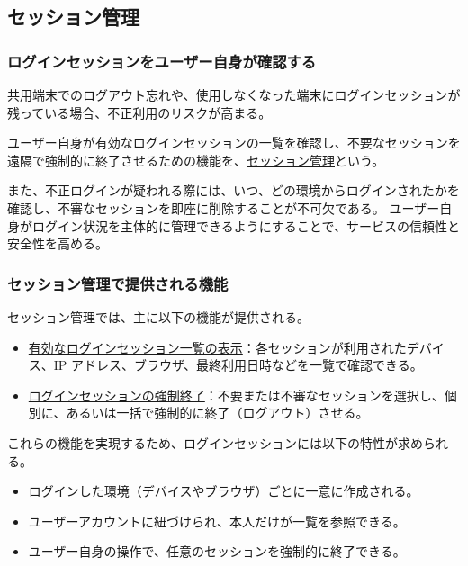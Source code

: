 \documentclass[uplatex]{jsarticle}
\def\label#1{}%
\begin{document}
\subsection{セッション管理}

\subsubsection{ログインセッションをユーザー自身が確認する}

共用端末でのログアウト忘れや、使用しなくなった端末にログインセッションが残っている場合、不正利用のリスクが高まる。

\begin{dfn}[セッション管理機能]\label{dfn:ch3-session-management-function}
ユーザー自身が有効なログインセッションの一覧を確認し、不要なセッションを遠隔で強制的に終了させるための機能を、\underline{セッション管理}という。
\end{dfn}

また、不正ログインが疑われる際には、いつ、どの環境からログインされたかを確認し、不審なセッションを即座に削除することが不可欠である。
ユーザー自身がログイン状況を主体的に管理できるようにすることで、サービスの信頼性と安全性を高める。

\subsubsection{セッション管理で提供される機能}

セッション管理では、主に以下の機能が提供される。
\begin{itemize}
\item \underline{有効なログインセッション一覧の表示}：各セッションが利用されたデバイス、IP アドレス、ブラウザ、最終利用日時などを一覧で確認できる。
\item \underline{ログインセッションの強制終了}：不要または不審なセッションを選択し、個別に、あるいは一括で強制的に終了（ログアウト）させる。
\end{itemize}
これらの機能を実現するため、ログインセッションには以下の特性が求められる。
\begin{itemize}
\item ログインした環境（デバイスやブラウザ）ごとに一意に作成される。
\item ユーザーアカウントに紐づけられ、本人だけが一覧を参照できる。
\item ユーザー自身の操作で、任意のセッションを強制的に終了できる。
\end{itemize}
\end{document}
